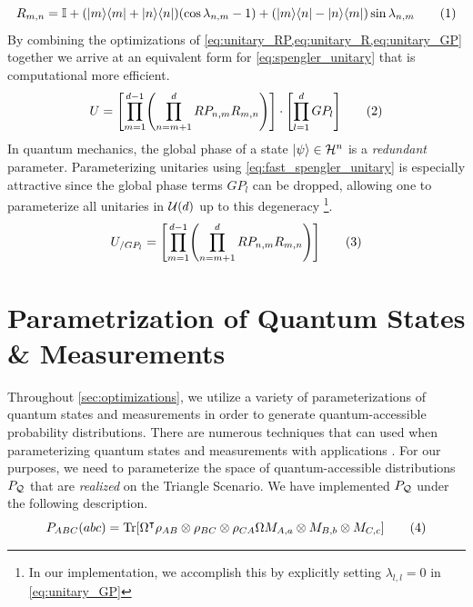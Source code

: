 \documentclass[aps, 10pt, english, twoside, pra, nofootinbib, longbibliography]{revtex4-1}
\theoremstyle{plain}
\theoremstyle{definition}
\theoremstyle{remark}
\newcommand{\Hilb}{\mathcal{H}}
\begin{document}
    \[ R_{m,n} = \mathbb{I} + \br{\ket{m}\bra{m} + \ket{n}\bra{n}} \br{\cos\lambda_{n,m} - 1} + \br{\ket{m}\bra{n} - \ket{n}\bra{m}} \sin\lambda_{n,m} \eq \label{eq:unitary_R} \]
    By combining the optimizations of \cref{eq:unitary_RP,eq:unitary_R,eq:unitary_GP} together we arrive at an equivalent form for \cref{eq:spengler_unitary} that is computational more efficient.
    \[ U = \bs{\prod_{m=1}^{d-1} \br{\prod_{n=m+1}^{d} RP_{n,m}R_{m,n}}} \cdot \bs{\prod_{l=1}^{d} GP_l} \eq \label{eq:fast_spengler_unitary} \]
    In quantum mechanics, the global phase of a state $\ket{\psi} \in \Hilb^n$ is a \textit{redundant} parameter. Parameterizing unitaries using \cref{eq:fast_spengler_unitary} is especially attractive since the global phase terms $GP_l$ can be dropped, allowing one to parameterize all unitaries in $\mathcal{U}\br{d}$ up to this degeneracy \cite{Spengler_2010_Unitary}\footnote{In our implementation, we accomplish this by explicitly setting $\lambda_{l,l} = 0$ in \cref{eq:unitary_GP}}.
    \[ U_{/ GP_l} = \bs{\prod_{m=1}^{d-1} \br{\prod_{n=m+1}^{d} RP_{n,m}R_{m,n}}} \eq \label{eq:fast_spengler_unitary_gp} \]

    \section{Parametrization of Quantum States \& Measurements}
    \label{sec:param_quantum_states}
    Throughout \cref{sec:optimizations}, we utilize a variety of parameterizations of quantum states and measurements in order to generate quantum-accessible probability distributions. There are numerous techniques that can used when parameterizing quantum states and measurements \cite{Petz_2015, Hedemann_2013,Spengler_2010_Unitary,Fujii_2005,James_2001} with applications . For our purposes, we need to parameterize the space of quantum-accessible distributions $\prob[\mathcal{Q}]$ that are \textit{realized} on the Triangle Scenario. We have implemented $\prob[\mathcal{Q}]$ under the following description.
    \[ \prob[ABC]\br{abc} = \Tr\bs{\Omega^\intercal \rho_{AB}\otimes\rho_{BC}\otimes\rho_{CA} \Omega M_{A,a}\otimes M_{B,b} \otimes M_{C,c}} \eq \label{eq:triangle_quantum_distributions} \]
\end{document}

